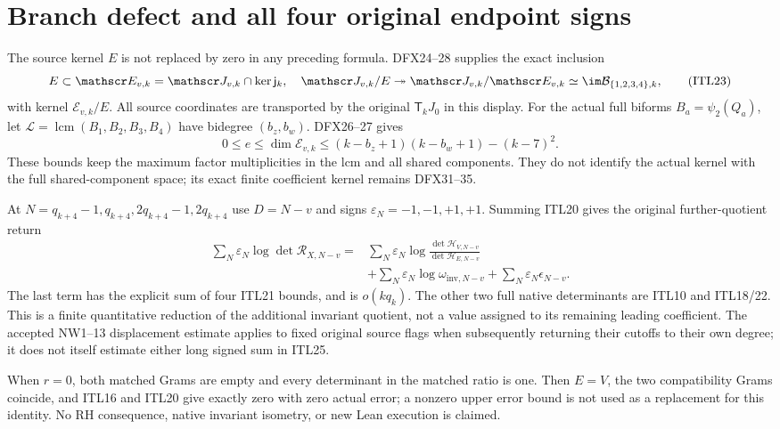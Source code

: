 \documentclass[11pt,a4paper]{article}
\begin{document}
\section{Branch defect and all four original endpoint signs}

The source kernel $E$ is not replaced by zero in any preceding
formula. DFX24--28 supplies the exact inclusion
\[
 E\subset\mathscr E_{v,k}
     =\mathscr J_{v,k}\cap\ker\mathsf j_k,
 \quad
 \mathscr J_{v,k}/E\twoheadrightarrow
 \mathscr J_{v,k}/\mathscr E_{v,k}
                 \simeq\im\mathcal B_{\{1,2,3,4\},k},
                                                        \tag{ITL23}
\]
with kernel $\mathscr E_{v,k}/E$. All source coordinates are
transported by the original $\mathsf T_kJ_0$ in this display.
For the actual full biforms $B_a=\psi_2(Q_a)$, let
$\mathcal L=\operatorname{lcm}(B_1,B_2,B_3,B_4)$ have
bidegree $(b_z,b_w)$. DFX26--27 gives
\[
 0\le e\le\dim\mathscr E_{v,k}
 \le(k-b_z+1)(k-b_w+1)-(k-7)^2 .                   \tag{ITL24}
\]
These bounds keep the maximum factor multiplicities in the
lcm and all shared components. They do not identify the
actual kernel with the full shared-component space; its
exact finite coefficient kernel remains DFX31--35.

At $N=q_{k+4}-1,q_{k+4},2q_{k+4}-1,2q_{k+4}$ use
$D=N-v$ and signs $\varepsilon_N=-1,-1,+1,+1$.
Summing ITL20 gives the original further-quotient return
\[
 \begin{split}
 \sum_N\varepsilon_N\log\det\mathscr R_{X,N-v}
 ={}&\sum_N\varepsilon_N
             \log\frac{\det\mathcal H_{V,N-v}}
                          {\det\mathcal H_{E,N-v}}\\
 &+\sum_N\varepsilon_N\log\omega_{\mathrm{inv},N-v}
                  +\sum_N\varepsilon_N\epsilon_{N-v}.
                                                        \end{split} \tag{ITL25}
\]
The last term has the explicit sum of four ITL21 bounds,
and is $o(kq_k)$. The other two full native determinants are
ITL10 and ITL18/22. This is a finite quantitative reduction
of the additional invariant quotient, not a value assigned
to its remaining leading coefficient. The accepted NW1--13
displacement estimate applies to fixed original source flags
when subsequently returning their cutoffs to their own degree;
it does not itself estimate either long signed sum in ITL25.

When $r=0$, both matched Grams are empty and every determinant
in the matched ratio is one. Then $E=V$, the two compatibility
Grams coincide, and ITL16 and ITL20 give exactly zero with
zero actual error; a nonzero upper error bound is not used
as a replacement for this identity. No RH consequence,
native invariant isometry, or new Lean execution is claimed.
\end{document}
